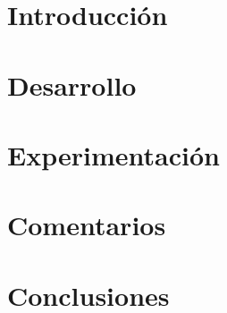 \documentclass[11pt, a4paper]{article}
\begin{document}
\def\runtitulo{Reconocimiento de dígitos}


\maketitle
\newpage


\newpage

\tableofcontents
\newpage

\section{Introducción}

\newpage

\section{Desarrollo}

\newpage

\section{Experimentación}

\newpage

\section{Comentarios}

\newpage

\section{Conclusiones}

\newpage
%



\end{document}

